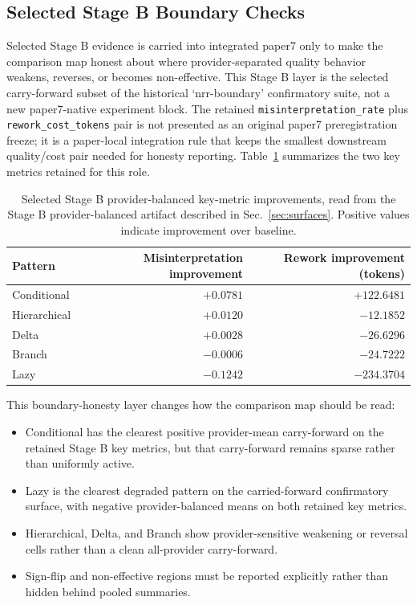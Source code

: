 \documentclass[11pt,a4paper]{article}
\begin{document}
\subsection{Selected Stage B Boundary Checks}

Selected Stage B evidence is carried into integrated paper7 only to make the comparison map honest about where provider-separated quality behavior weakens, reverses, or becomes non-effective. This Stage B layer is the selected carry-forward subset of the historical `nrr-boundary' confirmatory suite, not a new paper7-native experiment block. The retained \texttt{misinterpretation\_rate} plus \texttt{rework\_cost\_tokens} pair is not presented as an original paper7 preregistration freeze; it is a paper-local integration rule that keeps the smallest downstream quality/cost pair needed for honesty reporting. Table~\ref{tab:stageb_selected_integrated} summarizes the two key metrics retained for this role.

\begin{table}[t]
\centering
\small
\begin{tabular}{lrr}
\toprule
\textbf{Pattern} & \textbf{Misinterpretation improvement} & \textbf{Rework improvement (tokens)} \\
\midrule
Conditional & \(+0.0781\) & \(+122.6481\) \\
Hierarchical & \(+0.0120\) & \(-12.1852\) \\
Delta & \(+0.0028\) & \(-26.6296\) \\
Branch & \(-0.0006\) & \(-24.7222\) \\
Lazy & \(-0.1242\) & \(-234.3704\) \\
\bottomrule
\end{tabular}
\caption{Selected Stage B provider-balanced key-metric improvements, read from the Stage B provider-balanced artifact described in Sec.~\ref{sec:surfaces}. Positive values indicate improvement over baseline.}
\label{tab:stageb_selected_integrated}
\end{table}

This boundary-honesty layer changes how the comparison map should be read:
\begin{itemize}
  \item Conditional has the clearest positive provider-mean carry-forward on the retained Stage B key metrics, but that carry-forward remains sparse rather than uniformly active.
  \item Lazy is the clearest degraded pattern on the carried-forward confirmatory surface, with negative provider-balanced means on both retained key metrics.
  \item Hierarchical, Delta, and Branch show provider-sensitive weakening or reversal cells rather than a clean all-provider carry-forward.
  \item Sign-flip and non-effective regions must be reported explicitly rather than hidden behind pooled summaries.
\end{itemize}
\end{document}

